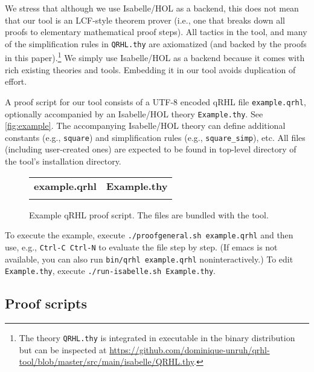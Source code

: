 \documentclass{article}
\begin{document}
We stress that although we use Isabelle/HOL as a backend, this does
not mean that our tool is an LCF-style theorem prover (i.e., one that
breaks down all proofs to elementary mathematical proof steps).  All
tactics in the tool, and many of the simplification rules in
\texttt{QRHL.thy} are axiomatized (and backed by the proofs in this
paper).\footnote{The theory \texttt{QRHL.thy} is integrated in executable in the binary distribution
  but can be inspected 
  at \url{https://github.com/dominique-unruh/qrhl-tool/blob/master/src/main/isabelle/QRHL.thy}.}
We simply use Isabelle/HOL as a backend because it comes with
rich existing theories and tools. Embedding it in our tool avoids
duplication of effort.

A proof script for our tool consists of a UTF-8 encoded qRHL file
\texttt{example.qrhl}, optionally accompanied by an Isabelle/HOL
theory \texttt{Example.thy}. See \autoref{fig:example}. The
accompanying Isabelle/HOL theory can define additional constants
(e.g., \texttt{square}) and simplification rules (e.g.,
\texttt{square\_simp}), etc.  All files (including user-created ones)
are expected to be found in top-level directory of the tool's installation directory.

\begin{figure}[t]\centering
  \lstset{aboveskip=0pt,belowskip=0pt,frame=single}
  \centering
  \begin{tabular}{p{.45\hsize}p{.45\hsize}}
    \textbf{example.qrhl}
    &
      \textbf{Example.thy}
    \\[-5pt]
    
    &
      
  \end{tabular}
  \vspace*{-5mm}
  \caption{Example qRHL proof script. The files are bundled with the tool.}
  \label{fig:example}
\end{figure}

To execute the example, execute \texttt{./proofgeneral.sh
  example.qrhl} and then use, e.g., \texttt{Ctrl-C Ctrl-N} to evaluate
the file step by step. (If emacs is not available, you can also run
\texttt{bin/qrhl example.qrhl} noninteractively.) To edit
\texttt{Example.thy}, execute \texttt{./run-isabelle.sh Example.thy}.

\subsection{Proof scripts}
\label{sec:tool.proofscripts}
\end{document}
